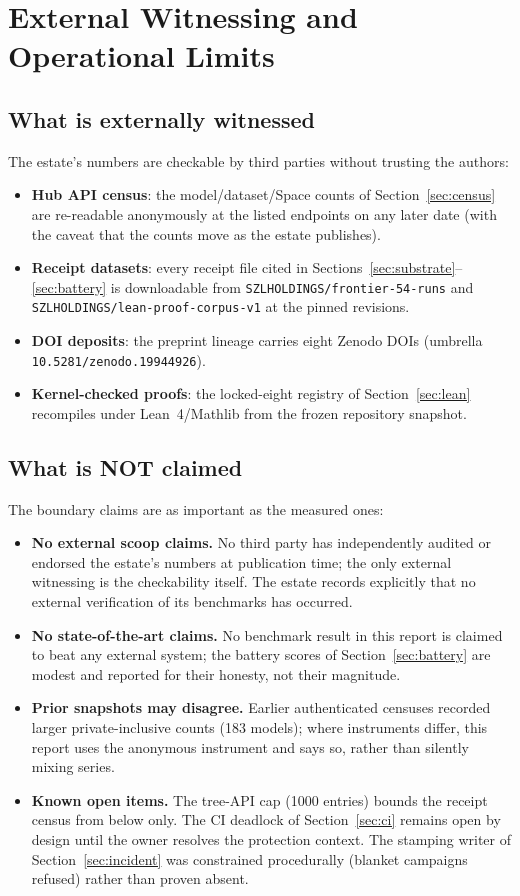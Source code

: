 ﻿\documentclass[11pt]{article}
\begin{document}
\section{External Witnessing and Operational Limits}
\label{sec:limits}

\subsection{What is externally witnessed}
The estate's numbers are checkable by third parties without trusting the authors:
\begin{itemize}
\item \textbf{Hub API census}: the model/dataset/Space counts of Section~\ref{sec:census} are re-readable anonymously at the listed endpoints on any later date (with the caveat that the counts move as the estate publishes).
\item \textbf{Receipt datasets}: every receipt file cited in Sections~\ref{sec:substrate}--\ref{sec:battery} is downloadable from \texttt{SZLHOLDINGS/frontier-54-runs} and \texttt{SZLHOLDINGS/lean-proof-corpus-v1} at the pinned revisions.
\item \textbf{DOI deposits}: the preprint lineage carries eight Zenodo DOIs (umbrella \texttt{10.5281/zenodo.19944926}).
\item \textbf{Kernel-checked proofs}: the locked-eight registry of Section~\ref{sec:lean} recompiles under Lean~4/Mathlib from the frozen repository snapshot.
\end{itemize}

\subsection{What is NOT claimed}
The boundary claims are as important as the measured ones:
\begin{itemize}
\item \textbf{No external scoop claims.} No third party has independently audited or endorsed the estate's numbers at publication time; the only external witnessing is the checkability itself. The estate records explicitly that no external verification of its benchmarks has occurred.
\item \textbf{No state-of-the-art claims.} No benchmark result in this report is claimed to beat any external system; the battery scores of Section~\ref{sec:battery} are modest and reported for their honesty, not their magnitude.
\item \textbf{Prior snapshots may disagree.} Earlier authenticated censuses recorded larger private-inclusive counts (183 models); where instruments differ, this report uses the anonymous instrument and says so, rather than silently mixing series.
\item \textbf{Known open items.} The tree-API cap (1000 entries) bounds the receipt census from below only. The CI deadlock of Section~\ref{sec:ci} remains open by design until the owner resolves the protection context. The stamping writer of Section~\ref{sec:incident} was constrained procedurally (blanket campaigns refused) rather than proven absent.
\end{itemize}
\end{document}
